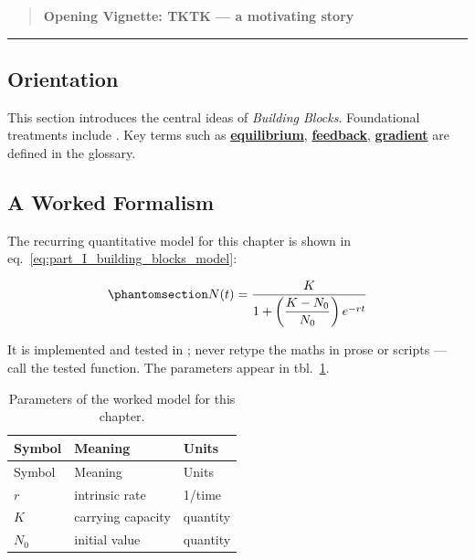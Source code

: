 \documentclass[
]{article}
\theoremstyle{plain}
\theoremstyle{definition}
\begin{document}
\begin{quote}
\textbf{Opening Vignette: TKTK --- a motivating story}
\end{quote}

\begin{center}\rule{0.5\linewidth}{0.5pt}\end{center}

\subsection{Orientation}\label{orientation-3}

This section introduces the central ideas of \emph{Building Blocks}.
Foundational treatments include
\citep{taylor2019theory, smith2020foundations}. Key terms such as
\hyperref[gl:equilibrium]{\textbf{equilibrium}},
\hyperref[gl:feedback]{\textbf{feedback}},
\hyperref[gl:gradient]{\textbf{gradient}} are defined in the glossary.

\subsection{A Worked Formalism}\label{a-worked-formalism-3}

The recurring quantitative model for this chapter is shown in
eq.~\ref{eq:part_I_building_blocks_model}:

\begin{equation}\protect\phantomsection\label{eq:part_I_building_blocks_model}{ N(t) = \frac{K}{1 + \left(\dfrac{K - N_0}{N_0}\right) e^{-rt}} }\end{equation}

It is implemented and tested in
; never retype the maths in
prose or scripts --- call the tested function. The parameters appear in
tbl.~\ref{tbl:part_I_building_blocks_parameters}.

\begin{longtable}[]{@{}lll@{}}
\caption{Parameters of the worked model for this
chapter.}\label{tbl:part_I_building_blocks_parameters}\tabularnewline
\toprule\noalign{}
Symbol & Meaning & Units \\
\midrule\noalign{}
\endfirsthead
\toprule\noalign{}
Symbol & Meaning & Units \\
\midrule\noalign{}
\endhead
\bottomrule\noalign{}
\endlastfoot
\(r\) & intrinsic rate & 1/time \\
\(K\) & carrying capacity & quantity \\
\(N_0\) & initial value & quantity \\
\end{longtable}
\end{document}
